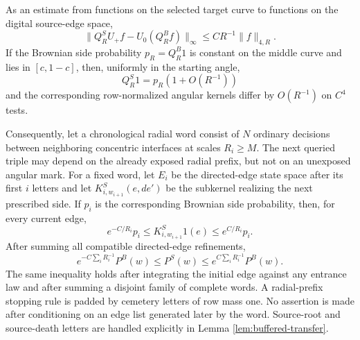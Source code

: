 \begin{lemma}
\label{lem:smooth-interface-discretization}
As an estimate from functions on the selected target curve to functions
on the digital source-edge space,
\begin{equation}
\|Q_R^SU_+f-U_0(Q_R^Bf)\|_\infty
       \le CR^{-1}\|f\|_{4,R}.\label{eq:ct-smooth-39b}
\end{equation}
If the Brownian side probability $p_R=Q_R^B1$ is constant on the
middle curve and lies in $[c,1-c]$, then, uniformly in the starting
angle,
\begin{equation}
Q_R^S1=p_R(1+O(R^{-1}))\label{eq:ct-smooth-39c}
\end{equation}
and the corresponding row-normalized angular kernels differ by
$O(R^{-1})$ on $C^4$ tests.

Consequently, let a chronological radial word consist of $N$
ordinary decisions between neighboring concentric interfaces at
scales $R_i\ge M$.  The next queried triple may depend on the already
exposed radial prefix, but not on an unexposed angular mark.  For a fixed
word, let $E_i$ be the directed-edge state space after its first $i$
letters and let $K^S_{i,w_{i+1}}(e,de')$ be the subkernel realizing the
next prescribed side.  If $p_i$ is the corresponding Brownian side
probability, then, for every current edge,
\begin{equation}
e^{-C/R_i}p_i\le K^S_{i,w_{i+1}}1(e)
          \le e^{C/R_i}p_i .\label{eq:ct-smooth-39cprime}
\end{equation}
After summing all compatible directed-edge refinements,
\begin{equation}
e^{-C\sum_iR_i^{-1}}P^B(w)
 \le P^S(w)\le
 e^{C\sum_iR_i^{-1}}P^B(w).\label{eq:ct-smooth-39d}
\end{equation}
The same inequality holds after integrating the initial edge against any
entrance law and after summing a disjoint family of complete words.  A
radial-prefix stopping rule is padded by cemetery letters of row mass one.
No assertion is made after conditioning on an edge list generated later by
the word.  Source-root and source-death letters are handled explicitly in
Lemma \ref{lem:buffered-transfer}.

\end{lemma}


